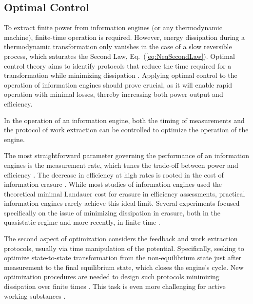 \documentclass[aps, twocolumn,floatfix,showpacs, superscriptaddress]{revtex4-2}
\newcommand{\ie}{information engines }
\begin{document}
\subsection{Optimal Control}

To extract finite power from \ie (or any thermodynamic machine), finite-time operation is required. However, energy dissipation during a thermodynamic transformation only vanishes in the case of a slow reversible process, which saturates the Second Law, Eq.~(\ref{eq:NeqSecondLaw}). 
Optimal control theory aims to identify protocols that reduce the time required for a transformation while minimizing dissipation \cite{schmiedl2007optimal, gomez2008optimal, rosales2020optimal, pires2023optimal, guery2023driving, loos2024universal, baldovin2024optimal}. Applying optimal control to the operation of \ie should prove crucial, as it will enable rapid operation with minimal losses, thereby increasing both power output and efficiency.

In the operation of an information engine, both the timing of measurements and the protocol of work extraction can be controlled to optimize the operation of the engine.

The most straightforward parameter governing the performance of an \ie is the measurement rate, which tunes the trade-off between power and efficiency \cite{saha2021maximizing, admon_experimental_2018}.
The decrease in efficiency at high rates is rooted in the cost of information erasure \cite{landauer1961irreversibility, lutz_information_2015}.
While most studies of \ie used the theoretical minimal Landauer cost for erasure in efficiency assessments, practical \ie rarely achieve this ideal limit. Several experiments focused specifically on the issue of minimizing dissipation in erasure, both in the quasistatic regime \cite{berut_experimental_2012, klaers_landauers_2019} and more recently, in finite-time \cite{dago2023adiabatic}.


The second aspect of optimization considers the feedback and work extraction protocols, usually via time manipulation of the potential.
Specifically, seeking to optimize state-to-state transformation from the non-equilibrium state just after measurement to the final equilibrium state, which closes the engine's cycle.
New optimization procedures are needed to design such protocols minimizing dissipation over finite times \cite{esposito_second_2011}.
This task is even more challenging for active working substances \cite{davis2024active}.
\end{document}
